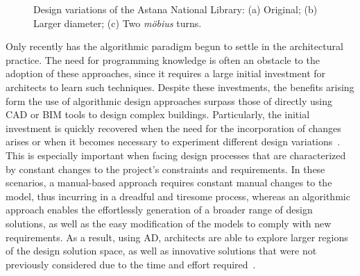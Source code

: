 \begin{figure}[htbp]
\centering
{}%
\hfill
{}%
\hfill
{}%

\caption[Design variations of the Astana's National Library]{Design variations of the Astana National Library: (a) Original; (b) Larger diameter; (c) Two \textit{möbius} turns.}
\label{fig:astana}
\end{figure}

Only recently has the algorithmic paradigm begun to settle in the architectural practice. The need for programming knowledge is often an obstacle to the adoption of these approaches, since it requires a large initial investment for architects to learn such techniques. Despite these investments, the benefits arising form the use of algorithmic design approaches surpass those of directly using \ac{CAD} or \ac{BIM} tools  to design complex buildings. Particularly, the initial investment is quickly recovered when the need for the incorporation of changes arises or when it becomes necessary to experiment different design variations~\cite{Leitao2014GD}. This is especially important when facing design processes that are characterized by constant changes to the project's constraints and requirements. In these scenarios, a manual-based approach requires constant manual changes to the model, thus incurring in a dreadful and tiresome process, whereas an algorithmic approach enables the effortlessly generation of a broader range of design solutions, as well as the easy modification of the models to comply with new requirements. As a result, using \ac{AD}, architects are able to explore larger regions of the design solution space, as well as innovative solutions that were not previously considered due to the time and effort required~\cite{Leitao2014GD}.

